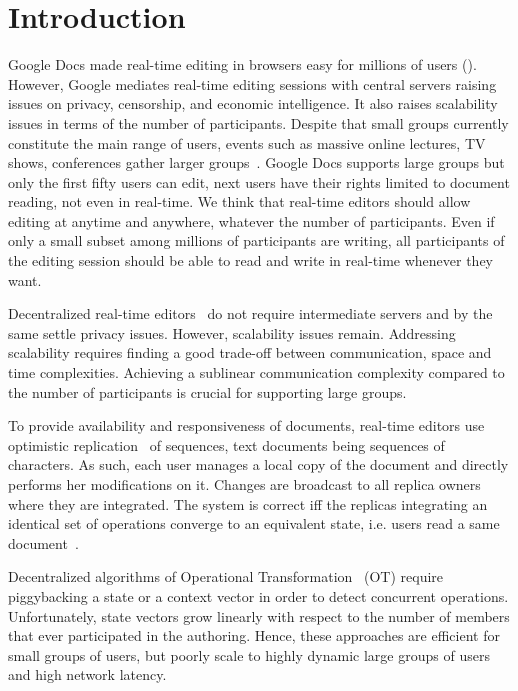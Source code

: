 
\section{Introduction}

Google Docs made real-time editing in browsers easy for millions of users
(\REF). However, Google mediates real-time editing sessions with central servers
raising issues on privacy, censorship, and economic intelligence. It also raises
scalability issues in terms of the number of participants.  Despite that small
groups currently constitute the main range of users, events such as massive
online lectures, TV shows, conferences gather larger
groups~\cite{breslow2013studying}.  Google Docs supports large groups but only
the first fifty users can edit, next users have their rights limited to document
reading, not even in real-time.  We think that real-time editors should allow
editing at anytime and anywhere, whatever the number of participants. Even if
only a small subset among millions of participants are writing, all participants
of the editing session should be able to read and write in real-time whenever
they want.

Decentralized real-time editors~\cite{oster2006data, sun1998operational,
  sun2009contextbased} do not require intermediate servers and by the same
settle privacy issues. However, scalability issues remain.  Addressing
scalability requires finding a good trade-off between communication, space and
time complexities. Achieving a sublinear communication complexity compared to
the number of participants is crucial for supporting large groups.

To provide availability and responsiveness of documents, real-time editors use
optimistic replication~\cite{saito2005optimistic} of sequences, text documents
being sequences of characters. As such, each user manages a local copy of the
document and directly performs her modifications on it. Changes are broadcast to
all replica owners where they are integrated. The system is correct iff the
replicas integrating an identical set of operations converge to an equivalent
state, i.e. users read a same document~\cite{shapiro2011conflict}.

Decentralized algorithms of Operational
Transformation~\cite{sun2009contextbased} (OT) require piggybacking a state or a
context vector in order to detect concurrent operations. Unfortunately, state
vectors grow linearly with respect to the number of members that ever
participated in the authoring. Hence, these approaches are efficient for small
groups of users, but poorly scale to highly dynamic large groups of users and
high network latency.

